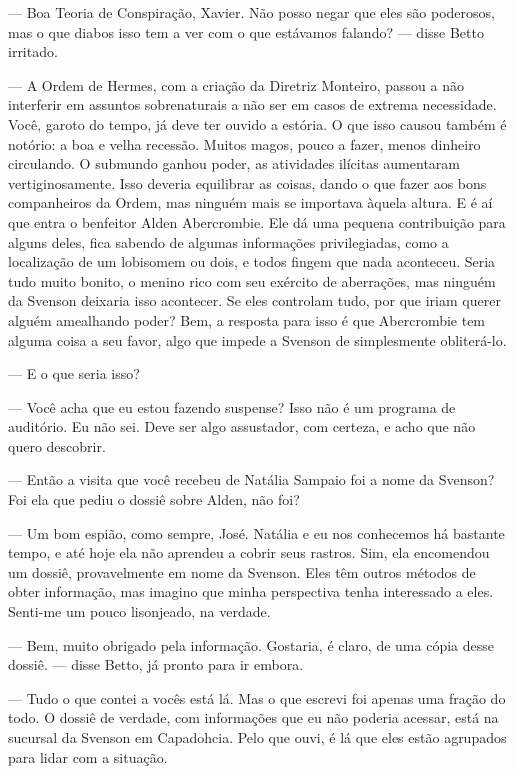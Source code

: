 --- Boa Teoria de Conspiração, Xavier. Não posso negar que eles são poderosos, mas o que diabos isso tem a ver com o que estávamos falando? --- disse Betto irritado.

--- A Ordem de Hermes, com a criação da Diretriz Monteiro, passou a não interferir em assuntos sobrenaturais a não ser em casos de extrema necessidade. Você, garoto do tempo, já deve ter ouvido a estória. O que isso causou também é notório: a boa e velha recessão. Muitos magos, pouco a fazer, menos dinheiro circulando. O submundo ganhou poder, as atividades ilícitas aumentaram vertiginosamente. Isso deveria equilibrar as coisas, dando o que fazer aos bons companheiros da Ordem, mas ninguém mais se importava àquela altura. E é aí que entra o benfeitor Alden Abercrombie. Ele dá uma pequena contribuição para alguns deles, fica sabendo de algumas informações privilegiadas, como a localização de um lobisomem ou dois, e todos fingem que nada aconteceu. Seria tudo muito bonito, o menino rico com seu exército de aberrações, mas ninguém da Svenson deixaria isso acontecer. Se eles controlam tudo, por que iriam querer alguém amealhando poder? Bem, a resposta para isso é que Abercrombie tem alguma coisa a seu favor, algo que impede a Svenson de simplesmente obliterá-lo.

--- E o que seria isso?

--- Você acha que eu estou fazendo suspense? Isso não é um programa de auditório. Eu não sei. Deve ser algo assustador, com certeza, e acho que não quero descobrir.

--- Então a visita que você recebeu de Natália Sampaio foi a nome da Svenson? Foi ela que pediu o dossiê sobre Alden, não foi?

--- Um bom espião, como sempre, José. Natália e eu nos conhecemos há bastante tempo, e até hoje ela não aprendeu a cobrir seus rastros. Sim, ela encomendou um dossiê, provavelmente em nome da Svenson. Eles têm outros métodos de obter informação, mas imagino que minha perspectiva tenha interessado a eles. Senti-me um pouco lisonjeado, na verdade.

--- Bem, muito obrigado pela informação. Gostaria, é claro, de uma cópia desse dossiê. --- disse Betto, já pronto para ir embora.

--- Tudo o que contei a vocês está lá. Mas o que escrevi foi apenas uma fração do todo. O dossiê de verdade, com informações que eu não poderia acessar, está na sucursal da Svenson em Capadohcia. Pelo que ouvi, é lá que eles estão agrupados para lidar com a situação.

